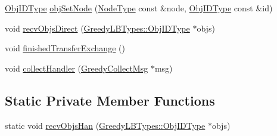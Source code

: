 \begin{DoxyCompactItemize}
\hyperlink{structvt_1_1vrt_1_1collection_1_1lb_1_1_base_l_b_a790b22acf448880599724749cdc4e9b3}{Obj\+I\+D\+Type} \hyperlink{structvt_1_1vrt_1_1collection_1_1lb_1_1_greedy_l_b_a38efce04a8fabdc16d89331b639f534f}{obj\+Set\+Node} (\hyperlink{namespacevt_a866da9d0efc19c0a1ce79e9e492f47e2}{Node\+Type} const \&node, \hyperlink{structvt_1_1vrt_1_1collection_1_1lb_1_1_base_l_b_a790b22acf448880599724749cdc4e9b3}{Obj\+I\+D\+Type} const \&id)
\item 
void \hyperlink{structvt_1_1vrt_1_1collection_1_1lb_1_1_greedy_l_b_a0e11225d8ff8a52f286f14a2c8f6cabb}{recv\+Objs\+Direct} (\hyperlink{structvt_1_1vrt_1_1collection_1_1lb_1_1_greedy_l_b_types_ae22670acd689e4ff83315fac2e4acb5e}{Greedy\+L\+B\+Types\+::\+Obj\+I\+D\+Type} $\ast$objs)
\item 
void \hyperlink{structvt_1_1vrt_1_1collection_1_1lb_1_1_greedy_l_b_aa2cdba9feec93e48d7cce1886a4eaa6a}{finished\+Transfer\+Exchange} ()
\item 
void \hyperlink{structvt_1_1vrt_1_1collection_1_1lb_1_1_greedy_l_b_ab5942458625157b9baae1e06b453a547}{collect\+Handler} (\hyperlink{structvt_1_1vrt_1_1collection_1_1lb_1_1_greedy_collect_msg}{Greedy\+Collect\+Msg} $\ast$msg)
\end{DoxyCompactItemize}
\subsection*{Static Private Member Functions}
\begin{DoxyCompactItemize}
\item 
static void \hyperlink{structvt_1_1vrt_1_1collection_1_1lb_1_1_greedy_l_b_a2590d9a14ee124f30d86557f3cc5fb25}{recv\+Objs\+Han} (\hyperlink{structvt_1_1vrt_1_1collection_1_1lb_1_1_greedy_l_b_types_ae22670acd689e4ff83315fac2e4acb5e}{Greedy\+L\+B\+Types\+::\+Obj\+I\+D\+Type} $\ast$objs)
\end{DoxyCompactItemize}
